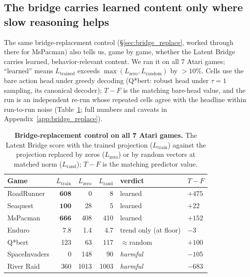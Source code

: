 \documentclass[11pt]{article}
\begin{document}
\subsection{The bridge carries learned content only where slow reasoning helps}
\label{sec:learned_content}

The same bridge-replacement control (\S\ref{sec:bridge_replace}, worked through there for MsPacman)
also tells us, game by game, whether the Latent Bridge carries learned, behavior-relevant content.
We ran it on all 7 Atari games; ``learned'' means
$L_{\text{trained}}$ exceeds $\max(L_{\text{zero}},L_{\text{random}})$ by $>\!10\%$. Cells use
the bare action head under greedy decoding (Q*bert: robust head under $\tau\!=\!1$ sampling,
its canonical decoder); $T\!-\!F$ is the matching bare-head value, and the run is an independent
re-run whose repeated cells agree with the headline within run-to-run noise (Table~\ref{tab:learned_content};
full numbers and caveats in Appendix~\ref{app:bridge_replace}).

\begin{table}[h]
\centering\small
\begin{tabular}{lrrrll}
\toprule
Game & $L_{\text{train}}$ & $L_{\text{zero}}$ & $L_{\text{rand}}$ & verdict & $T\!-\!F$ \\
\midrule
RoadRunner    & $\mathbf{608}$ & 0     & 8     & learned & $+475$ \\
Seaquest      & $\mathbf{100}$ & 28    & 5     & learned & $+22$  \\
MsPacman      & $\mathbf{666}$ & 408   & 410   & learned & $+152$ \\
Enduro        & 7.8            & 1.4   & 4.7   & trend only (at floor) & $-3$ \\
Q*bert        & 123            & 63    & 117   & $\approx$random & $+100$ \\
SpaceInvaders & 0              & 148   & 90    & \emph{harmful} & $-105$ \\
River Raid    & 360            & 1013  & 1003  & \emph{harmful} & $-683$ \\
\bottomrule
\end{tabular}
\caption{\textbf{Bridge-replacement control on all 7 Atari games.} The Latent Bridge score with the
trained projection ($L_{\text{train}}$) against the projection replaced by zeros ($L_{\text{zero}}$)
or by random vectors at matched norm ($L_{\text{rand}}$); $T\!-\!F$ is the matching predictor value.}
\label{tab:learned_content}
\end{table}
\end{document}
